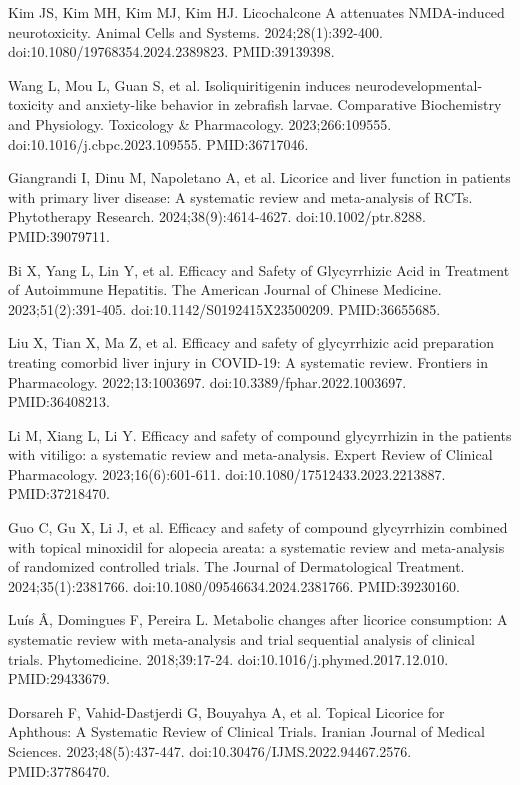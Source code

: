 \documentclass[12pt,oneside]{book}
\newcommand{\reff}[2]{\par\hangindent=7mm\hangafter=1\noindent[#1]\hspace{2mm}#2\par}
\begin{document}
\reff{27}{Kim JS, Kim MH, Kim MJ, Kim HJ. Licochalcone A attenuates NMDA-induced neurotoxicity. Animal Cells and Systems. 2024;28(1):392-400. doi:10.1080/19768354.2024.2389823. PMID:39139398.}

\reff{28}{Wang L, Mou L, Guan S, et al. Isoliquiritigenin induces neurodevelopmental-toxicity and anxiety-like behavior in zebrafish larvae. Comparative Biochemistry and Physiology. Toxicology \& Pharmacology. 2023;266:109555. doi:10.1016/j.cbpc.2023.109555. PMID:36717046.}

\reff{29}{Giangrandi I, Dinu M, Napoletano A, et al. Licorice and liver function in patients with primary liver disease: A systematic review and meta-analysis of RCTs. Phytotherapy Research. 2024;38(9):4614-4627. doi:10.1002/ptr.8288. PMID:39079711.}

\reff{30}{Bi X, Yang L, Lin Y, et al. Efficacy and Safety of Glycyrrhizic Acid in Treatment of Autoimmune Hepatitis. The American Journal of Chinese Medicine. 2023;51(2):391-405. doi:10.1142/S0192415X23500209. PMID:36655685.}

\reff{31}{Liu X, Tian X, Ma Z, et al. Efficacy and safety of glycyrrhizic acid preparation treating comorbid liver injury in COVID-19: A systematic review. Frontiers in Pharmacology. 2022;13:1003697. doi:10.3389/fphar.2022.1003697. PMID:36408213.}

\reff{32}{Li M, Xiang L, Li Y. Efficacy and safety of compound glycyrrhizin in the patients with vitiligo: a systematic review and meta-analysis. Expert Review of Clinical Pharmacology. 2023;16(6):601-611. doi:10.1080/17512433.2023.2213887. PMID:37218470.}

\reff{33}{Guo C, Gu X, Li J, et al. Efficacy and safety of compound glycyrrhizin combined with topical minoxidil for alopecia areata: a systematic review and meta-analysis of randomized controlled trials. The Journal of Dermatological Treatment. 2024;35(1):2381766. doi:10.1080/09546634.2024.2381766. PMID:39230160.}

\reff{34}{Luís Â, Domingues F, Pereira L. Metabolic changes after licorice consumption: A systematic review with meta-analysis and trial sequential analysis of clinical trials. Phytomedicine. 2018;39:17-24. doi:10.1016/j.phymed.2017.12.010. PMID:29433679.}

\reff{35}{Dorsareh F, Vahid-Dastjerdi G, Bouyahya A, et al. Topical Licorice for Aphthous: A Systematic Review of Clinical Trials. Iranian Journal of Medical Sciences. 2023;48(5):437-447. doi:10.30476/IJMS.2022.94467.2576. PMID:37786470.}
\end{document}
